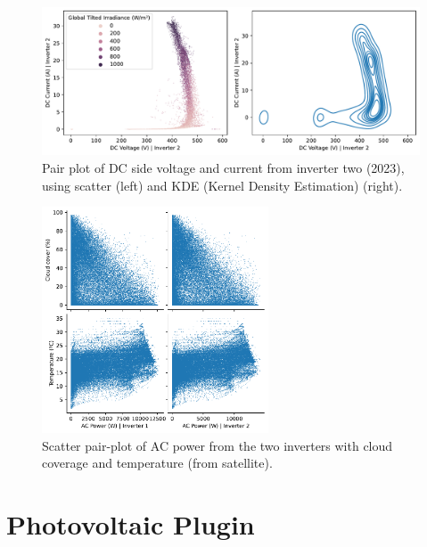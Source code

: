 \begin{figure}[h]
    \centering
    \includegraphics[width=\textwidth]{figures/appendix/b_analysis/07_voltage_current_pairplot_test_2.pdf}
    \caption{Pair plot of DC side voltage and current from inverter two (2023), using scatter (left) and KDE (Kernel Density Estimation) (right).}
    \label{fig:eda_voltage_current_test_2}
\end{figure}

\begin{figure}[h]
    \centering
    \includegraphics[width=0.6\textwidth]{figures/appendix/b_analysis/12_power_meteo_pairplot_kb.pdf}
    \caption{Scatter pair-plot of AC power from the two inverters with cloud coverage and temperature (from satellite).}
    \label{fig:eda_irrelevant_meteo}
\end{figure}

\FloatBarrier

\section{Photovoltaic Plugin}

